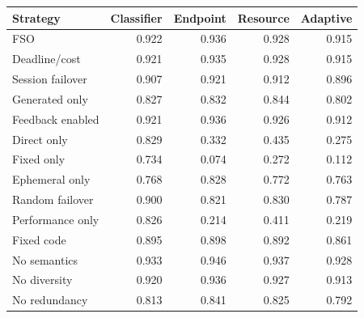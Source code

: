 \begin{tabular}{lrrrr}
\toprule
Strategy & Classifier & Endpoint & Resource & Adaptive \\
\midrule
FSO & 0.922 & 0.936 & 0.928 & 0.915 \\
Deadline/cost & 0.921 & 0.935 & 0.928 & 0.915 \\
Session failover & 0.907 & 0.921 & 0.912 & 0.896 \\
Generated only & 0.827 & 0.832 & 0.844 & 0.802 \\
Feedback enabled & 0.921 & 0.936 & 0.926 & 0.912 \\
Direct only & 0.829 & 0.332 & 0.435 & 0.275 \\
Fixed only & 0.734 & 0.074 & 0.272 & 0.112 \\
Ephemeral only & 0.768 & 0.828 & 0.772 & 0.763 \\
Random failover & 0.900 & 0.821 & 0.830 & 0.787 \\
Performance only & 0.826 & 0.214 & 0.411 & 0.219 \\
Fixed code & 0.895 & 0.898 & 0.892 & 0.861 \\
No semantics & 0.933 & 0.946 & 0.937 & 0.928 \\
No diversity & 0.920 & 0.936 & 0.927 & 0.913 \\
No redundancy & 0.813 & 0.841 & 0.825 & 0.792 \\
\bottomrule
\end{tabular}
